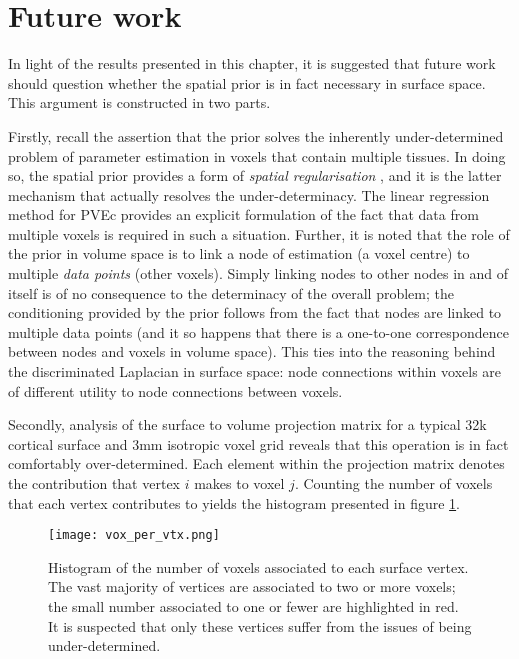 \section{Future work}
\label{svb_future}

In light of the results presented in this chapter, it is suggested that future work should question whether the spatial prior is in fact necessary in surface space. This argument is constructed in two parts. 

Firstly, recall the assertion that the prior solves the inherently under-determined problem of parameter estimation in voxels that contain multiple tissues. In doing so, the spatial prior provides a form of \textit{spatial regularisation} \cite{Groves2009a}, and it is the latter mechanism that actually resolves the under-determinacy. The linear regression method for PVEc provides an explicit formulation of the fact that data from multiple voxels is required in such a situation. Further, it is noted that the role of the prior in volume space is to link a node of estimation (a voxel centre) to multiple \textit{data points} (other voxels). Simply linking nodes to other nodes in and of itself is of no consequence to the determinacy of the overall problem; the conditioning provided by the prior follows from the fact that nodes are linked to multiple data points (and it so happens that there is a one-to-one correspondence between nodes and voxels in volume space). This ties into the reasoning behind the discriminated Laplacian in surface space: node connections within voxels are of different utility to node connections between voxels. 

Secondly, analysis of the surface to volume projection matrix for a typical 32k cortical surface and 3mm isotropic voxel grid reveals that this operation is in fact comfortably over-determined. Each element within the projection matrix denotes the contribution that vertex $i$ makes to voxel $j$. Counting the number of voxels that each vertex contributes to yields the histogram presented in figure \ref{vox_per_vtx}. 

\begin{figure}[H]
\centering
\texttt{[image: vox\_per\_vtx.png]}
\caption{Histogram of the number of voxels associated to each surface vertex. The vast majority of vertices are associated to two or more voxels; the small number associated to one or fewer are highlighted in red. It is suspected that only these vertices suffer from the issues of being under-determined.}
\label{vox_per_vtx} 
\end{figure}

